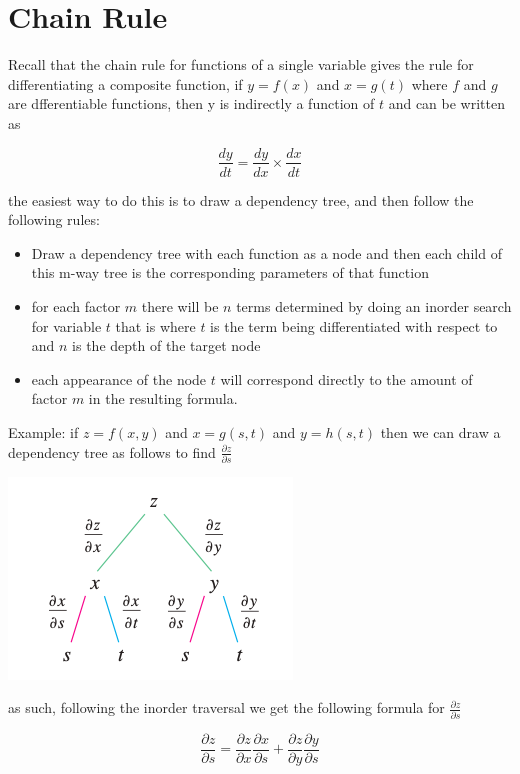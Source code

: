 \documentclass{article}
\begin{document}
\newpage
\section{Chain Rule}

Recall that the chain rule for functions of a single variable gives the rule for differentiating a composite function, if $y = f(x)$ and $x = g(t)$ where $f$ and $g$ are dfferentiable functions, then y is indirectly a function of $t$ and can be written as 

$$\frac{dy}{dt} = \frac{dy}{dx} \times \frac{dx}{dt} $$

the easiest way to do this is to draw a dependency tree, and then follow the following rules:

\begin{itemize}
    \item Draw a dependency tree with each function as a node and then each child of this m-way tree is the corresponding parameters of that function
    \item for each factor $m$ there will be $n$ terms determined by doing an inorder search for variable $t$ that is where $t$ is the term being differentiated with respect to and $n$ is the depth of the target node
    \item each appearance of the node $t$ will correspond directly to the amount of factor $m$ in the resulting formula.
\end{itemize}

Example: if $z = f(x,y)$ and $x = g(s,t)$ and $y = h(s,t)$ then we can draw a dependency tree as follows to find $\frac{\partial z}{\partial s}$

\includegraphics[scale=1]{dptree.png}

as such, following the inorder traversal we get the following formula for $\frac{\partial z}{\partial s}$

$$\frac{\partial z}{\partial s} = \frac{\partial z}{\partial x}\frac{\partial x}{\partial s} + \frac{\partial z}{\partial y} \frac{\partial y}{\partial s}$$
\end{document}
